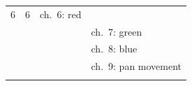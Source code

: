\begin{longtable}[]{@{}llll@{}}
\begin{minipage}[t]{0.12\columnwidth}
6\strut
\end{minipage} & \begin{minipage}[t]{0.15\columnwidth}\raggedright\strut
6\strut
\end{minipage} & \begin{minipage}[t]{0.28\columnwidth}\raggedright\strut
ch.~6: red\strut
\end{minipage}\tabularnewline
\begin{minipage}[t]{0.17\columnwidth}\raggedright\strut
\strut
\end{minipage} & \begin{minipage}[t]{0.12\columnwidth}\raggedright\strut
\strut
\end{minipage} & \begin{minipage}[t]{0.15\columnwidth}\raggedright\strut
\strut
\end{minipage} & \begin{minipage}[t]{0.28\columnwidth}\raggedright\strut
ch.~7: green\strut
\end{minipage}\tabularnewline
\begin{minipage}[t]{0.17\columnwidth}\raggedright\strut
\strut
\end{minipage} & \begin{minipage}[t]{0.12\columnwidth}\raggedright\strut
\strut
\end{minipage} & \begin{minipage}[t]{0.15\columnwidth}\raggedright\strut
\strut
\end{minipage} & \begin{minipage}[t]{0.28\columnwidth}\raggedright\strut
ch.~8: blue\strut
\end{minipage}\tabularnewline
\begin{minipage}[t]{0.17\columnwidth}\raggedright\strut
\strut
\end{minipage} & \begin{minipage}[t]{0.12\columnwidth}\raggedright\strut
\strut
\end{minipage} & \begin{minipage}[t]{0.15\columnwidth}\raggedright\strut
\strut
\end{minipage} & \begin{minipage}[t]{0.28\columnwidth}\raggedright\strut
ch.~9: pan movement\strut
\end{minipage}\tabularnewline
\begin{minipage}[t]{0.17\columnwidth}\raggedright\strut
\strut
\end{minipage} & \begin{minipage}[t]{0.12\columnwidth}\raggedright\strut

\end{minipage}
\end{longtable}
